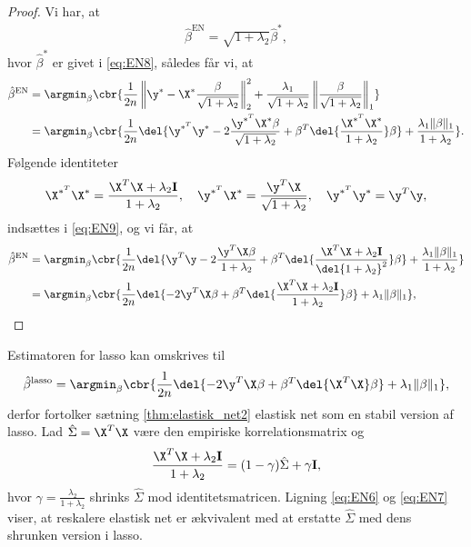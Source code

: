 \begin{proof}
Vi har, at
\begin{align*}
\hat{\beta}^\text{EN} = \sqrt{1+\lambda_2} \hat{\beta}^*,
\end{align*}
hvor \(\hat{\beta}^*\) er givet i \eqref{eq:EN8}, således får vi, at
\begin{align}
\hat{\beta}^\text{EN} &= \argmin_{\beta} \cbr{\frac{1}{2n} \left\Vert \y^* - \X^* \frac{\beta}{\sqrt{1+\lambda_2}} \right\Vert_2^2 + \frac{\lambda_1}{\sqrt{1+\lambda_2}} \left\Vert \frac{\beta}{\sqrt{1+\lambda_2}} \right\Vert_1} \nonumber \\
&=\argmin_{\beta} \cbr{\frac{1}{2n} \del{ \y^{*^T} \y^* - 2 \frac{\y^{*^T} \X^* \beta}{\sqrt{1+\lambda_2}} + \beta^T \del{\frac{\X^{*^T} \X^*}{1+\lambda_2}} \beta} + \frac{\lambda_1 \Vert \beta \Vert_1}{1+\lambda_2}}. \label{eq:EN9}
\end{align}
Følgende identiteter
\begin{align*}
\X^{*^T} \X^* = \frac{\X^T \X + \lambda_2 \mathbf{I}}{1+ \lambda_2}, \quad \y^{*^T} \X^* = \frac{\y^T \X}{\sqrt{1+\lambda_2}} , \quad \y^{*^T} \y^* = \y^T \y, 
\end{align*}
indsættes i \eqref{eq:EN9}, og vi får, at
\begin{align*}
\hat{\beta}^\text{EN} &= \argmin_{\beta} \cbr{\frac{1}{2n} \del{\y^T \y - 2 \frac{\y^T \X \beta}{1+\lambda_2} + \beta^T \del{\frac{\X^T \X + \lambda_2 \mathbf{I}}{\del{1+\lambda_2}^2}} \beta} + \frac{\lambda_1 \Vert \beta \Vert_1}{1+\lambda_2}} \\ 
&= \argmin_{\beta} \cbr{ \frac{1}{2n} \del{- 2 \y^T \X \beta + \beta^T \del{\frac{\X^T \X + \lambda_2 \mathbf{I}}{1+ \lambda_2}} \beta } + \lambda_1 \Vert \beta \Vert_1},
\end{align*}
\end{proof}
%
Estimatoren for lasso kan omskrives til
\begin{align}
\hat{\beta}^\text{lasso} = \argmin_\beta \cbr{ \frac{1}{2n} \del{ - 2 \y^T \X \beta + \beta^T \del{\X^T \X} \beta } + \lambda_1 \Vert \beta \Vert_1}, \label{eq:EN7}
\end{align}
derfor fortolker sætning \ref{thm:elastisk_net2} elastisk net som en stabil version af lasso.
Lad \(\hat{\Sigma} = \X^T \X\) være den empiriske korrelationsmatrix og
\begin{align*}
\frac{\X^T \X + \lambda_2 \mathbf{I}}{1 + \lambda_2} = (1-\gamma) \hat{\Sigma} + \gamma \mathbf{I},
\end{align*}
hvor \(\gamma=\frac{\lambda_2}{1+\lambda_2}\) shrinks \(\hat{\Sigma}\) mod identitetsmatricen.
Ligning \eqref{eq:EN6} og \eqref{eq:EN7} viser, at reskalere elastisk net er ækvivalent med at erstatte \(\hat{\Sigma}\) med dens shrunken version i lasso.


